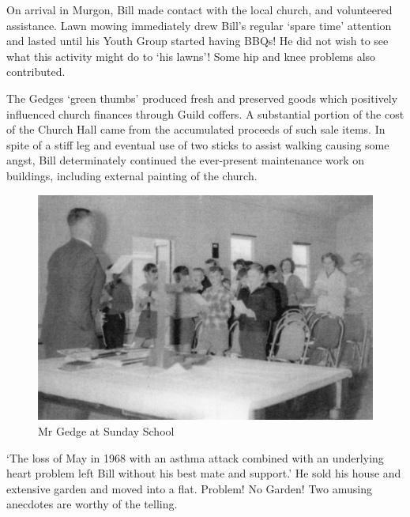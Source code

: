On arrival in Murgon, Bill made contact with the local church, and volunteered assistance. Lawn mowing immediately drew Bill's regular `spare time' attention and lasted until his Youth Group started having BBQs! He did not wish to see what this activity might do to `his lawns'! Some hip and knee problems also contributed.



The Gedges `green thumbs' produced fresh and preserved goods which positively influenced church finances through Guild coffers. A substantial portion of the cost of the Church Hall came from the accumulated proceeds of such sale items. In spite of a stiff leg and eventual use of two sticks to assist walking causing some angst, Bill determinately continued the ever-present maintenance work on buildings, including external painting of the church.









\begin{figure}
\begin{center}
\includegraphics[width=1.\linewidth,center]{../images/gedgeSundaySchool.jpg}
\caption{Mr Gedge at Sunday School}
\end{center}
\end{figure}




`The loss of May in 1968 with an asthma attack combined with an underlying heart problem left Bill without his best mate and support.' He sold his house and extensive garden and moved into a flat. Problem! No Garden! Two amusing anecdotes are worthy of the telling.



